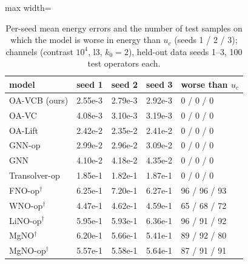 \begin{table}[tbp]\centering\footnotesize\setlength{\tabcolsep}{4pt}
\caption{Per-seed mean energy errors and the number of test samples on which the model is worse in energy than $u_c$ (seeds 1 / 2 / 3); channels (contrast $10^4$, l3, $k_0=2$), held-out data seeds 1--3, 100 test operators each.}\label{tab:channelsfull}
\begin{adjustbox}{max width=\linewidth}
\begin{tabular}{lllll}\toprule
model & seed 1 & seed 2 & seed 3 & worse than $u_c$ \\\midrule
OA-VCB (ours) & 2.55e-3 & 2.79e-3 & 2.92e-3 & 0 / 0 / 0 \\
OA-VC & 4.08e-3 & 3.10e-3 & 3.19e-3 & 0 / 0 / 0 \\
OA-Lift & 2.42e-2 & 2.35e-2 & 2.41e-2 & 0 / 0 / 0 \\
GNN-op & 2.99e-2 & 2.96e-2 & 3.09e-2 & 0 / 0 / 0 \\
GNN & 4.10e-2 & 4.18e-2 & 4.35e-2 & 0 / 0 / 0 \\
Transolver-op & 1.85e-1 & 1.82e-1 & 1.87e-1 & 0 / 0 / 0 \\
FNO-op$^\dagger$ & 6.25e-1 & 7.20e-1 & 6.27e-1 & 96 / 96 / 93 \\
WNO-op$^\dagger$ & 4.47e-1 & 4.62e-1 & 4.59e-1 & 65 / 68 / 72 \\
LiNO-op$^\dagger$ & 5.95e-1 & 5.93e-1 & 6.36e-1 & 96 / 91 / 92 \\
MgNO$^\dagger$ & 6.20e-1 & 5.66e-1 & 5.41e-1 & 89 / 92 / 80 \\
MgNO-op$^\dagger$ & 5.57e-1 & 5.58e-1 & 5.64e-1 & 87 / 91 / 91 \\
\bottomrule\end{tabular}
\end{adjustbox}
\end{table}
